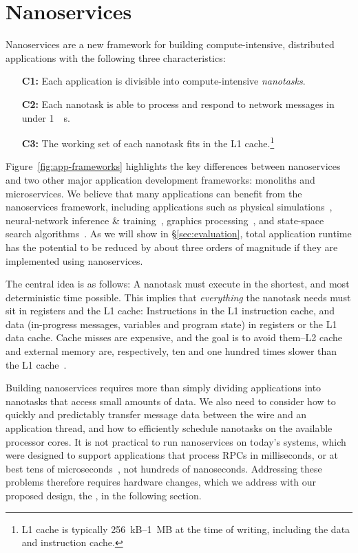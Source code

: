 \section{Nanoservices}
\label{sec:nanoservices}
Nanoservices are a new framework for building compute-intensive, distributed applications with the following three characteristics:

\vspace{0.5pt}
\begin{itemize}
    \item[\bf C1:] Each application is divisible into compute-intensive {\em nanotasks}.
    \item[\bf C2:] Each nanotask is able to process and respond to network messages in under \SI{1}{\mu s}.
    \item[\bf C3:] The working set of each nanotask fits in the L1 cache.\footnote{L1 cache is typically \SI{256}{kB}--\SI{1}{MB} at the time of writing, including the data and instruction cache.}
\end{itemize}
\vspace{0.5pt}

Figure~\ref{fig:app-frameworks} highlights the key differences between nanoservices and two other major application development frameworks: monoliths and microservices.
We believe that many applications can benefit from the nanoservices framework, including applications such as physical simulations~\cite{barnes-hut, molecular-dynamics}, neural-network inference \& training~\cite{tensorflow}, graphics processing~\cite{ray-tracing}, and state-space search algorithms~\cite{state-space-search}.
As we will show in \S\ref{sec:evaluation}, total application runtime has the potential to be reduced by about three orders of magnitude if they are implemented using nanoservices.

The central idea is as follows: A nanotask must execute in the shortest, and most deterministic time possible. 
This implies that {\em everything} the nanotask needs must sit in registers and the L1 cache: Instructions in the L1 instruction cache, and data (in-progress messages, variables and program state) in registers or the L1 data cache. 
Cache misses are expensive, and the goal is to avoid them--L2 cache and external memory are, respectively, ten and one hundred times slower than the L1 cache~\cite{jeff-dean-numbers}.

Building nanoservices requires more than simply dividing applications into nanotasks that access small amounts of data.
We also need to consider how to quickly and predictably transfer message data between the wire and an application thread, and how to efficiently schedule nanotasks on the available processor cores.
It is not practical to run nanoservices on today's systems, which were designed to support applications that process RPCs in milliseconds, or at best tens of microseconds~\cite{eRPC, perfkit-grpc}, not hundreds of nanoseconds.
Addressing these problems therefore requires hardware changes, which we address with our proposed design, the \name{}, in the following section.

